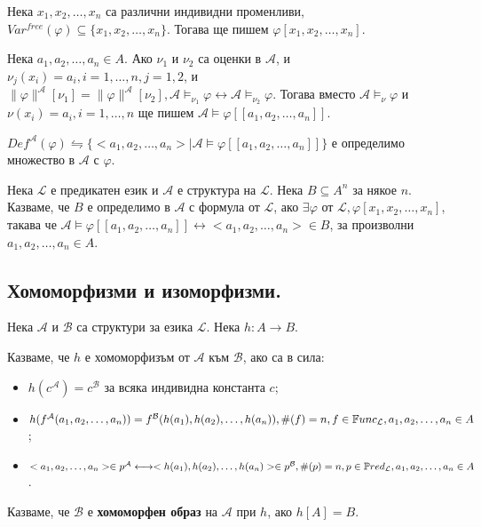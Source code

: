 \documentclass{article}
\begin{document}
\begin{mydef}
Нека $x_1, x_2, \ldots, x_n$ са различни индивидни променливи, $Var^{free}(\varphi) \subseteq \{x_1, x_2, \ldots, x_n\}$. Тогава ще пишем $\varphi[x_1, x_2, \ldots, x_n]$.

Нека $a_1, a_2, \ldots, a_n \in A$. Ако $\nu_1$ и $\nu_2$ са оценки в $\mathcal{A}$, и $\nu_j(x_i) = a_i, i = 1, \ldots, n, j = 1, 2$, и $\|\varphi\|^\mathcal{A}[\nu_1] = \|\varphi\|^\mathcal{A}[\nu_2], \mathcal{A} \models_{\nu_1} \varphi \longleftrightarrow \mathcal{A} \models_{\nu_2} \varphi$. Тогава вместо $\mathcal{A} \models_\nu \varphi$ и $\nu(x_i) = a_i, i= 1, \ldots, n$ ще пишем $\mathcal{A} \models \varphi [\![a_1, a_2, \ldots	, a_n ]\!]$.

\end{mydef}

\begin{mydef}
$Def^\mathcal{A}(\varphi) \leftrightharpoons \{<a_1, a_2, \ldots, a_n> | \mathcal{A} \models \varphi[\![a_1, a_2, \ldots, a_n]\!]\}$ е определимо множество в $\mathcal{A}$ с $\varphi$.
\end{mydef}

\begin{mydef}
Нека $\mathcal{L}$ е предикатен език и $\mathcal{A}$ е структура на $\mathcal{L}$. Нека $B \subseteq A^n$ за някое $n$. Казваме, че $B$ е определимо в $\mathcal{A}$ с формула от $\mathcal{L}$, ако $\exists\varphi$ от $\mathcal{L}, \varphi[x_1, x_2, \ldots, x_n]$, такава че $\mathcal{A} \models \varphi [\![a_1, a_2, \ldots, a_n]\!] \longleftrightarrow <a_1, a_2, \ldots, a_n> \in B$, за произволни $a_1, a_2, \ldots, a_n \in A$.
\end{mydef}


\subsection*{Хомоморфизми и изоморфизми.}

\begin{mydef}[Хомоморфизъм]
Нека $\mathcal{A}$ и $\mathcal{B}$ са структури за езика $\mathcal{L}$. Нека $h: A \longrightarrow B$.

Казваме, че $h$ е хомоморфизъм от $\mathcal{A}$ към $\mathcal{B}$, ако са в сила:

\begin{itemize}
\item $h(c^\mathcal{A}) = c^\mathcal{B}$ за всяка индивидна константа $c$;
\item $h(f^\mathcal{A}(a_1, a_2, \ldots, a_n)) = f^\mathcal{B}(h(a_1), h(a_2), \ldots, h(a_n)), \#(f) = n, f \in \mathbb{F}unc_\mathcal{L}, \\ a_1, a_2, \ldots, a_n \in A$;
\item $<a_1, a_2, \ldots, a_n> \in p^\mathcal{A} \longleftrightarrow <h(a_1), h(a_2), \ldots, h(a_n)> \in p^\mathcal{B}, \#(p) = n, p \in \mathbb{P}red_\mathcal{L}, \\ a_1, a_2, \ldots, a_n \in A$.
\end{itemize}

Казваме, че $\mathcal{B}$ е \textbf{хомоморфен образ} на $\mathcal{A}$ при $h$, ако $h[A] = B$.
\end{mydef}
\end{document}
